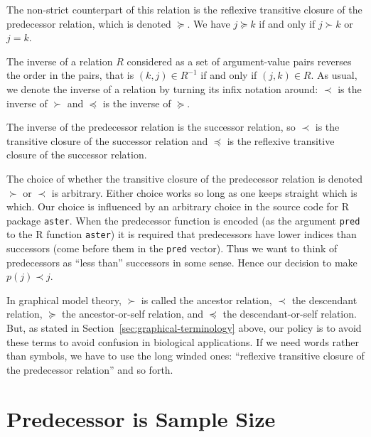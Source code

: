 The non-strict counterpart of this relation
is the reflexive transitive closure of the predecessor relation,
which is denoted $\succeq$.
We have $j \succeq k$ if and only if $j \succ k$ or $j = k$.

The inverse of a relation $R$ considered as a set of argument-value pairs
reverses the order in the pairs, that is $(k, j) \in R^{- 1}$ if and only
if $(j, k) \in R$.
As usual, we denote the inverse of a relation by turning its infix notation
around: $\prec$ is the inverse of $\succ$ and $\preceq$ is the inverse
of $\succeq$.

The inverse of the predecessor relation is the successor relation,
so $\prec$ is the transitive closure of the successor relation
and $\preceq$ is the reflexive transitive closure of the successor relation.

The choice of whether the transitive closure of the predecessor relation
is denoted $\succ$ or $\prec$ is arbitrary.  Either choice works so long
as one keeps straight which is which.  Our choice is influenced by an
arbitrary choice in the source code for R package \texttt{aster}.  When
the predecessor function is encoded (as the argument \texttt{pred} to the
R function \texttt{aster}) it is required that predecessors have lower indices
than successors (come before them in the \texttt{pred} vector).  Thus we
want to think of predecessors as ``less than'' successors in some sense.
Hence our decision to make $p(j) \prec j$.

In graphical model theory,
$\succ$ is called the ancestor relation,
$\prec$ the descendant relation,
$\succeq$ the ancestor-or-self relation, and
$\preceq$ the descendant-or-self relation.
But, as stated in Section~\ref{sec:graphical-terminology} above,
our policy is to avoid these terms
to avoid confusion in biological applications.
If we need words rather than symbols, we have to use the long winded ones:
``reflexive transitive closure of the predecessor relation'' and so forth.

\section{Predecessor is Sample Size}
\label{sec:piss}

